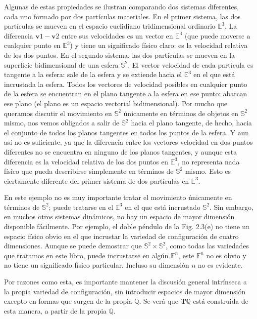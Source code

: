     Algunas de estas propiedades se ilustran comparando dos sistemas diferentes, cada uno formado por dos partículas materiales. En el primer sistema, las dos partículas se mueven en el espacio euclidiano tridimensional ordinario $\mathbb{E}^{3}$. La diferencia $\mathbf{v}{1}-\mathbf{v}{2}$ entre sus velocidades es un vector en $\mathbb{E}^{3}$ (que puede moverse a cualquier punto en $\mathbb{E}^{3}$) y tiene un significado físico claro: es la velocidad relativa de los dos puntos. En el segundo sistema, las dos partículas se mueven en la superficie bidimensional de una esfera $\mathbb{S}^{2}$. El vector velocidad de cada partícula es tangente a la esfera: sale de la esfera y se extiende hacia el $\mathbb{E}^{3}$ en el que está incrustada la esfera. Todos los vectores de velocidad posibles en cualquier punto de la esfera se encuentran en el plano tangente a la esfera en ese punto: abarcan ese plano (el plano es un espacio vectorial bidimensional). Por mucho que queramos discutir el movimiento en $\mathbb{S}^{2}$ únicamente en términos de objetos en $\mathbb{S}^{2}$ mismo, nos vemos obligados a salir de $\mathbb{S}^{2}$ hacia el plano tangente, de hecho, hacia el conjunto de todos los planos tangentes en todos los puntos de la esfera. Y aun así no es suficiente, ya que la diferencia entre los vectores velocidad en dos puntos diferentes no se encuentra en ninguno de los planos tangentes, y aunque esta diferencia es la velocidad relativa de los dos puntos en $\mathbb{E}^{3}$, no representa nada físico que pueda describirse simplemente en términos de $\mathbb{S}^{2}$ mismo. Esto es ciertamente diferente del primer sistema de dos partículas en $\mathbb{E}^{3}$.
    
    En este ejemplo no es muy importante tratar el movimiento únicamente en términos de $\mathbb{S}^{2}$; puede tratarse en el $\mathbb{E}^{3}$ en el que está incrustado $\mathbb{S}^{2}$. Sin embargo, en muchos otros sistemas dinámicos, no hay un espacio de mayor dimensión disponible fácilmente. Por ejemplo, el doble péndulo de la Fig. 2.3(e) no tiene un espacio físico obvio en el que incrustar la variedad de configuración de cuatro dimensiones. Aunque se puede demostrar que $\mathbb{S}^{2} \times \mathbb{S}^{2}$, como todas las variedades que tratamos en este libro, puede incrustarse en algún $\mathbb{E}^{n}$, este $\mathbb{E}^{n}$ no es obvio y no tiene un significado físico particular. Incluso su dimensión $n$ no es evidente.
    
    Por razones como esta, es importante mantener la discusión general intrínseca a la propia variedad de configuración, sin introducir espacios de mayor dimensión excepto en formas que surgen de la propia $\mathbb{Q}$. Se verá que $\mathbf{T} \mathbb{Q}$ está construida de esta manera, a partir de la propia $\mathbb{Q}$.
    
